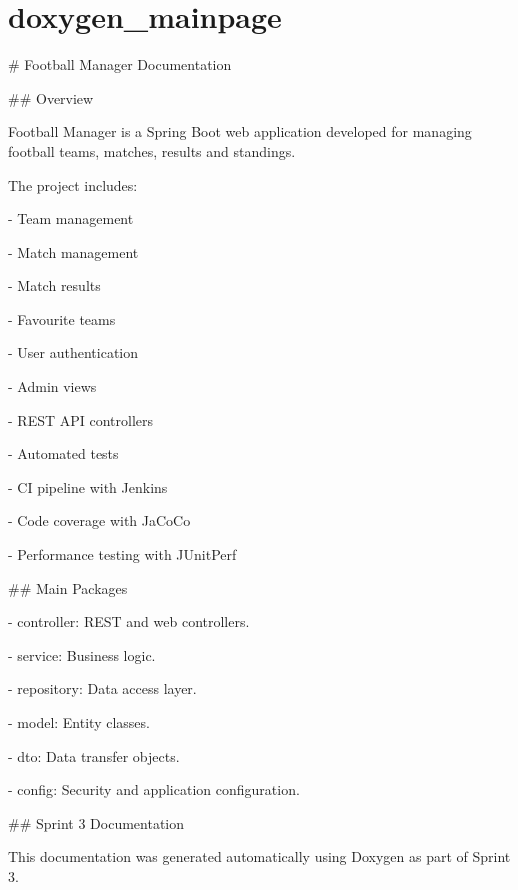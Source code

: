 \chapter{doxygen\+\_\+mainpage}
\hypertarget{md_docs_2doxygen__mainpage}{}\label{md_docs_2doxygen__mainpage}
\# Football Manager Documentation

\#\# Overview

Football Manager is a Spring Boot web application developed for managing football teams, matches, results and standings.

The project includes\+:

-\/ Team management

-\/ Match management

-\/ Match results

-\/ Favourite teams

-\/ User authentication

-\/ Admin views

-\/ REST API controllers

-\/ Automated tests

-\/ CI pipeline with Jenkins

-\/ Code coverage with Ja\+Co\+Co

-\/ Performance testing with JUnit\+Perf

\#\# Main Packages

-\/ {\ttfamily controller}\+: REST and web controllers.

-\/ {\ttfamily service}\+: Business logic.

-\/ {\ttfamily repository}\+: Data access layer.

-\/ {\ttfamily model}\+: Entity classes.

-\/ {\ttfamily dto}\+: Data transfer objects.

-\/ {\ttfamily config}\+: Security and application configuration.

\#\# Sprint 3 Documentation

This documentation was generated automatically using Doxygen as part of Sprint 3. 